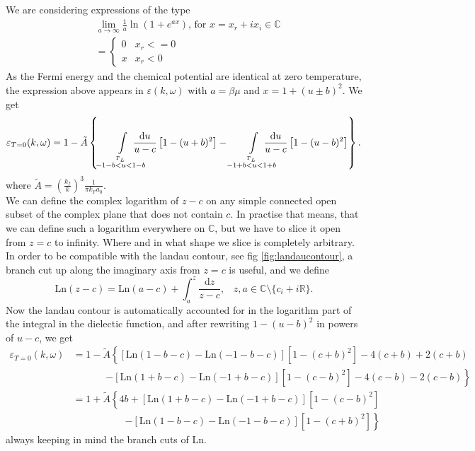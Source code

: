 \documentclass[physics,phd,nolot,nolof]{uccthesis}%
\newcommand{\Ln}{\text{Ln}}
\begin{document}
{We are considering expressions of the type
\begin{equation}
  \begin{split}
 &\lim_{a\to\infty} \frac{1}{a}\ln\left(1+e^{ a x} \right) \text{, for } x=x_r+ix_i \in \mathbb{C}\\
 & =\begin{cases}
    0	&  x_r<=0\\
    x   &  x_r<0
  \end{cases}
\end{split}
  \label{eq:lindhardlimit}
\end{equation}
As the Fermi energy and the chemical potential are identical at zero temperature,
the expression above appears in $\varepsilon(k,\omega)$ with $a=\beta\mu$ and 
$x=1+(u\pm b)^2$.
We get
\begin{equation}
  \varepsilon_{T=0}(k,\omega)=
  1-\tilde{A} \left\lbrace
  \int\limits_{\stackrel{\Gamma_L}{-1-b<u<1-b}}\mkern-30mu\frac{\mathrm{d} u}{u-c}\left[1-(u+b)^2\right]
  -\int\limits_{\stackrel{\Gamma_L}{-1+b<u<1+b}}\mkern-30mu\frac{\mathrm{d} u}{u-c}\left[1-(u-b)^2\right]
 \right\rbrace.
  \label{eq:epslindhard-derivation}
\end{equation}
where $\tilde{A}=\left(\frac{k_f}{k}\right)^3\frac{1}{\pi k_F a_0}$.\\
We can define the complex logarithm of $z-c$
on any simple connected open subset of the complex plane that does not contain $c$. 
In practise that means, that we can define such a logarithm everywhere on $\mathbb{C}$, but we have to slice it open from $z=c$ to infinity. 
Where and in what shape we slice is completely arbitrary.
In order to be compatible with the landau contour, see fig \ref{fig:landaucontour},
a branch cut up along the imaginary axis from $z=c$ is useful, and we define 
\begin{equation}
  \Ln(z-c)= \Ln(a-c) +\int_a^z \frac{\mathrm{d} z}{z-c},
 \;\;\;
z, a \in \mathbb{C}\setminus\lbrace c_i+i\mathbb{R}\rbrace.
  \label{eq:Ln(z-c)}
\end{equation}
Now the landau contour is automatically accounted for in the logarithm part of the integral in the dielectic function, and after rewriting $1-(u-b)^2$ in powers of $u-c$, 
we get
\begin{equation}
  \begin{split}
 \varepsilon_{T=0}(k,\omega)&
 =1-\tilde{A}\left\lbrace
  \left[\Ln(1-b-c)-\Ln(-1-b-c)\right]\left[ 1- (c+b)^2\right]
  -4(c+b) +2(c+b)
  \right.\\ &\;\;\;\;\;\;\;\;\;\;\;\;   \left.
  -\left[\Ln(1+b-c)-\Ln(-1+b-c)\right]\left[ 1- (c-b)^2\right]
  -4(c-b) -2(c-b)\right\rbrace
  \\
 & = 1+\tilde{A}\left\lbrace 4b
  +\left[\Ln(1+b-c)-\Ln(-1+b-c)\right]\left[ 1- (c-b)^2\right]
  \right.\\ &\;\;\;\;\;\;\;\;\;\;\;\;\;\;\;\;\;\;\;   \left.
  -\left[\Ln(1-b-c)-\Ln(-1-b-c)\right]\left[ 1- (c+b)^2\right]
  \right\rbrace
  \end{split}
  \label{eq:epslindhard}
\end{equation}
always keeping in mind the branch cuts of $\Ln$.

}
\end{document}
